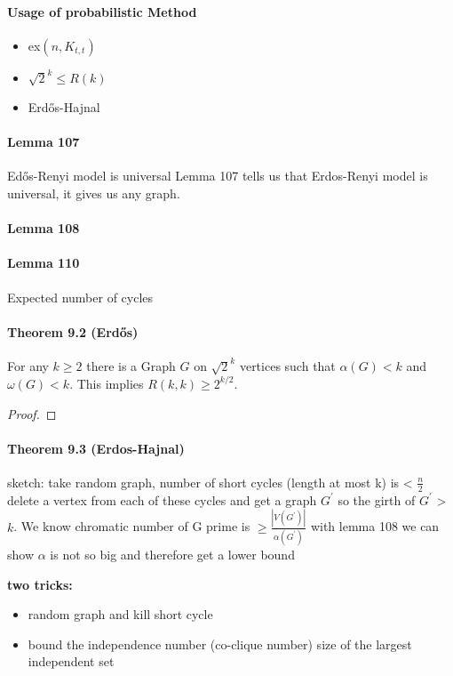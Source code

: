 \paragraph{Usage of probabilistic Method}
\begin{itemize}
    \item ex$(n,K_{t,t})$
    \item $\sqrt{2}^k \leq R(k)$
    \item Erd\H{o}s-Hajnal
\end{itemize}

\paragraph{Lemma 107} Ed\H{o}s-Renyi model is universal
{\color{red}{TODO}}
Lemma 107 tells us that Erdos-Renyi model is universal, it gives us any graph.

\paragraph{Lemma 108}
{\color{red}{TODO}}

\paragraph{Lemma 110} Expected number of cycles \\
{\color{red}{TODO}}

\paragraph{Theorem 9.2 (Erd\H{o}s)} 
For any $k \geq 2$ there is a Graph $G$ on $\sqrt{2}^k$ vertices such that 
$\alpha(G) < k$ and $\omega(G) < k$. This implies $R(k,k) \geq 2^{k/2}$.
\begin{proof}
    {\color{red}{TODO}}   
\end{proof}


\paragraph{Theorem 9.3 (Erdos-Hajnal)} 
sketch: take random graph, number of short cycles (length at most k) is < $ \frac{n}{2} $ 
delete a vertex from each of these cycles and get a graph $G^\prime $ so the girth
of $ G^\prime $ > $ k $.
We know chromatic number of G prime is $ \geq \frac{|V(G^\prime)|}{\alpha(G^\prime)} $
with lemma 108 we can show $ \alpha $ is not so big and therefore get a lower bound

\smallskip \noindent
\textbf{two tricks:} 
\begin{itemize}
    \item random graph and kill short cycle 
    \item bound the independence number (co-clique number) size of the largest 
    independent set
\end{itemize}